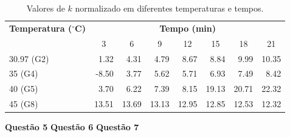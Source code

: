 \documentclass{article}
\begin{document}
\begin{table}[H]
\centering
\caption{Valores de $k$ normalizado em diferentes temperaturas e tempos.}
\label{tab:k_norm}
\begin{tabular}{lrrrrrrr}
\toprule
\textbf{Temperatura ($^{\circ}$C)} & \multicolumn{7}{c}{\textbf{Tempo (min)}} \\
\cmidrule(lr){2-8}
 & \multicolumn{1}{c}{3} & \multicolumn{1}{c}{6} & \multicolumn{1}{c}{9} & \multicolumn{1}{c}{12} & \multicolumn{1}{c}{15} & \multicolumn{1}{c}{18} & \multicolumn{1}{c}{21} \\
\midrule
30.97 (G2) & 1.32 & 4.31 & 4.79 & 8.67 & 8.84 & 9.99 & 10.35 \\
35 (G4)    & -8.50 & 3.77 & 5.62 & 5.71 & 6.93 & 7.49 & 8.42 \\
40 (G5)    & 3.70 & 6.22 & 7.39 & 8.15 & 19.13 & 20.71 & 22.32 \\
45 (G8)    & 13.51 & 13.69 & 13.13 & 12.95 & 12.85 & 12.53 & 12.32 \\
\bottomrule
\end{tabular}
\end{table}
\textbf{Questão 5}
\textbf{Questão 6}
\textbf{Questão 7}

    
    
\end{document}
